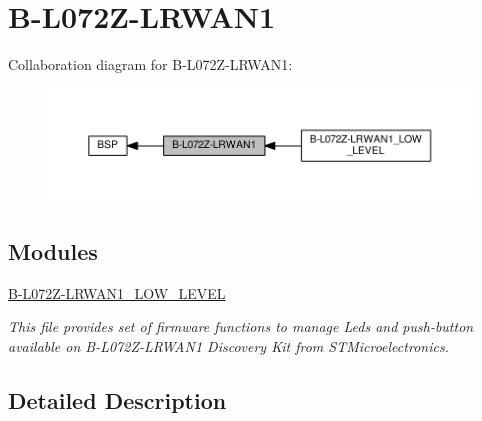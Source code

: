 \hypertarget{group__B-L072Z-LRWAN1}{}\section{B-\/\+L072\+Z-\/\+L\+R\+W\+A\+N1}
\label{group__B-L072Z-LRWAN1}
Collaboration diagram for B-\/\+L072\+Z-\/\+L\+R\+W\+A\+N1\+:
\nopagebreak
\begin{figure}[H]
\begin{center}
\leavevmode
\includegraphics[width=350pt]{group__B-L072Z-LRWAN1}
\end{center}
\end{figure}
\subsection*{Modules}
\begin{DoxyCompactItemize}
\item 
\hyperlink{group__B-L072Z-LRWAN1__LOW__LEVEL}{B-\/\+L072\+Z-\/\+L\+R\+W\+A\+N1\+\_\+\+L\+O\+W\+\_\+\+L\+E\+V\+EL}
\begin{DoxyCompactList}\small\item\em This file provides set of firmware functions to manage Leds and push-\/button available on B-\/\+L072\+Z-\/\+L\+R\+W\+A\+N1 Discovery Kit from S\+T\+Microelectronics. \end{DoxyCompactList}\end{DoxyCompactItemize}


\subsection{Detailed Description}
